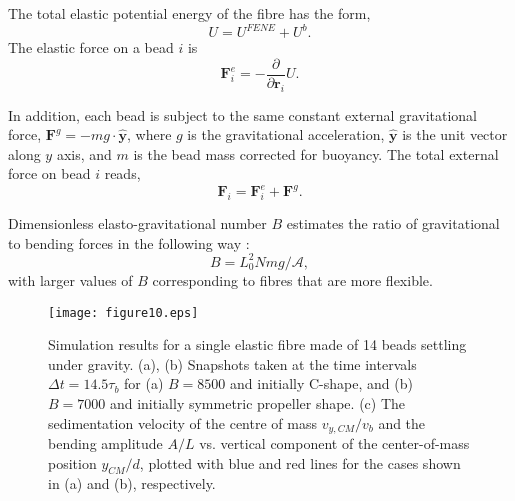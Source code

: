 \documentclass{article}
\begin{document}
The total elastic potential energy of the fibre %
has the form,
\begin{equation}
U = %
U^{FENE}
+ %
U^b.
\end{equation}
The %
elastic force on a bead $i$ is
\begin{equation}
\bm{F}_i^e=- \frac{\partial}{\partial \bm{r}_i} U.
\end{equation}

In addition, each bead is subject to the same constant external gravitational force, %
$\bm{F}^g = - m g \cdot \mathbf{ \hat{y} }$, where $g$ is the gravitational acceleration, $ \mathbf{ \hat{y} }$ is the unit vector along $y$ axis,  and $m$ is the bead mass corrected for buoyancy. The total external force on bead $i$ reads,
\begin{equation}
\bm{F}_i=\bm{F}_i^e + \bm{F}^g.
\end{equation}

Dimensionless elasto-gravitational number $B$ estimates the ratio of gravitational to bending forces %
in the following way \cite{llopis2007sedimentation,lagomarsino2005hydrodynamic,saggiorato2015conformations,marchetti2018deformation,bukowicki2018different,bukowicki2019sedimenting}:
\begin{equation}
    B = L_{0}^2 Nmg %
    / \mathcal{A},
\end{equation}
with larger values of $B$ corresponding to fibres that are more flexible. %



\begin{figure*}[t!]
    \centering
    \texttt{[image: figure10.eps]}
    \caption{
    Simulation results for a single elastic fibre made of 14 beads  settling under gravity. (a), (b) 
    Snapshots taken %
    at the %
    time intervals 
    $\Delta t = 14.5 \tau_b$ 
    for %
    (a) $B=8500$ and initially C-shape, and
    (b) $B=7000$ and initially symmetric propeller shape.
    (c) The sedimentation velocity of the centre of mass $v_{y,CM}/v_b$ and the bending amplitude $A/L$ vs. vertical component of the center-of-mass position $y_{CM}/d$, %
    plotted with blue and red lines for the cases shown in (a) and (b), respectively.
    }
    \label{fig:figure_simulations_14}
\end{figure*}
\end{document}
